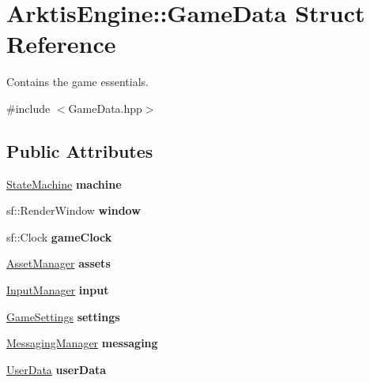 \hypertarget{struct_arktis_engine_1_1_game_data}{}\section{Arktis\+Engine\+::Game\+Data Struct Reference}
\label{struct_arktis_engine_1_1_game_data}


Contains the game essentials.  




{\ttfamily \#include $<$Game\+Data.\+hpp$>$}

\subsection*{Public Attributes}
\begin{DoxyCompactItemize}
\item 
\mbox{\label{struct_arktis_engine_1_1_game_data_a56b145ead46e8f3809d6522e53a65b14}} 
\mbox{\hyperlink{class_arktis_engine_1_1_state_machine}{State\+Machine}} {\bfseries machine}
\item 
\mbox{\label{struct_arktis_engine_1_1_game_data_a660b36bf241efffe1a4cd38ab6b2a652}} 
sf\+::\+Render\+Window {\bfseries window}
\item 
\mbox{\label{struct_arktis_engine_1_1_game_data_a3cae8beb68bdb2a09395dc6fa83ad8b3}} 
sf\+::\+Clock {\bfseries game\+Clock}
\item 
\mbox{\label{struct_arktis_engine_1_1_game_data_af9e9a428e977ca05483736934ff72033}} 
\mbox{\hyperlink{class_arktis_engine_1_1_asset_manager}{Asset\+Manager}} {\bfseries assets}
\item 
\mbox{\label{struct_arktis_engine_1_1_game_data_adbbfc1f33b46af1d6c76b0e4f644c72d}} 
\mbox{\hyperlink{class_arktis_engine_1_1_input_manager}{Input\+Manager}} {\bfseries input}
\item 
\mbox{\label{struct_arktis_engine_1_1_game_data_a7c00ff0816c1c436dcf3aab1d4dc6905}} 
\mbox{\hyperlink{struct_arktis_engine_1_1_game_settings}{Game\+Settings}} {\bfseries settings}
\item 
\mbox{\label{struct_arktis_engine_1_1_game_data_ae03db69094e00516aa23ed38fabb8738}} 
\mbox{\hyperlink{class_arktis_engine_1_1_messaging_manager}{Messaging\+Manager}} {\bfseries messaging}
\item 
\mbox{\label{struct_arktis_engine_1_1_game_data_a9ded51f130014c1960242d0c8ad9a8e4}} 
\mbox{\hyperlink{struct_arktis_engine_1_1_user_data}{User\+Data}} {\bfseries user\+Data}
\end{DoxyCompactItemize}


